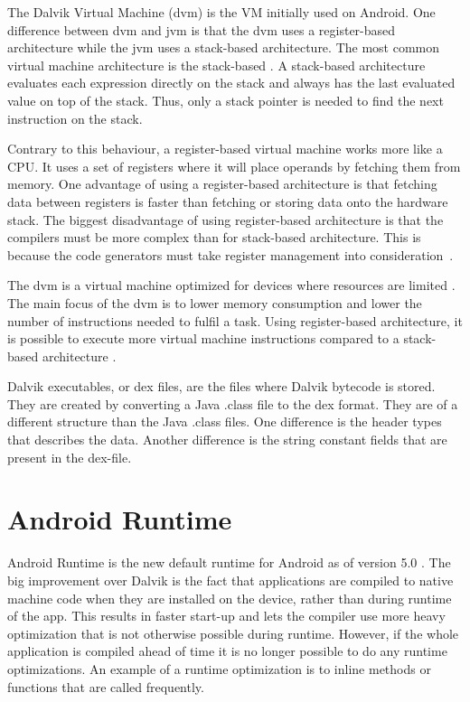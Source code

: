 The Dalvik Virtual Machine (\gls{dvm}) is the VM initially used on Android. One difference between \gls{dvm} and \gls{jvm} is that the \gls{dvm} uses a register-based architecture while the \gls{jvm} uses a stack-based architecture. The most common virtual machine architecture is the stack-based \cite[p.~158]{craig2010virtual}. A stack-based architecture evaluates each expression directly on the stack and always has the last evaluated value on top of the stack. Thus, only a stack pointer is needed to find the next instruction on the stack.

Contrary to this behaviour, a register-based virtual machine works more like a CPU. It uses a set of registers where it will place operands by fetching them from memory. One advantage of using a register-based architecture is that fetching data between registers is faster than fetching or storing data onto the hardware stack. The biggest disadvantage of using register-based architecture is that the compilers must be more complex than for stack-based architecture. This is because the code generators must take register management into consideration~\cite[p.~159-160]{craig2010virtual}.

The \gls{dvm} is a virtual machine optimized for devices where resources are limited \cite{android:dalvik:internals}. The main focus of the \gls{dvm} is to lower memory consumption and lower the number of instructions needed to fulfil a task. Using register-based architecture, it is possible to execute more virtual machine instructions compared to a stack-based architecture \cite{shi2008virtual}. 


Dalvik executables, or \gls{dex} files, are the files where Dalvik bytecode is stored. They are created by converting a Java .class file to the \gls{dex} format. They are of a different structure than the Java .class files. One difference is the header types that describes the data. Another difference is the string constant fields that are present in the \gls{dex}-file. %

\section{Android Runtime}
Android Runtime is the new default runtime for Android as of version 5.0 \cite{android:dalvik}. The big improvement over Dalvik is the fact that applications are compiled to native machine code when they are installed on the device, rather than during runtime of the app. This results in faster start-up \cite{li2016advanced} and lets the compiler use more heavy optimization that is not otherwise possible during runtime. However, if the whole application is compiled ahead of time it is no longer possible to do any runtime optimizations. An example of a runtime optimization is to inline methods or functions that are called frequently.

